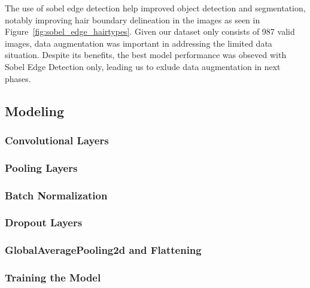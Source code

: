 The use of sobel edge detection help improved object detection and segmentation, notably improving hair boundary delineation in the images as seen in Figure~\ref{fig:sobel_edge_hairtypes}. Given our dataset only consists of 987 valid images, data augmentation was important in addressing the limited data situation. Despite its benefits, the best model performance was obseved with Sobel Edge Detection only, leading us to exlude data augmentation in next phases.

\subsection{Modeling}

\subsubsection{Convolutional Layers}


\subsubsection{Pooling Layers}

\subsubsection{Batch Normalization}

\subsubsection{Dropout Layers}

\subsubsection{GlobalAveragePooling2d and Flattening}



\subsubsection{Training the Model}


